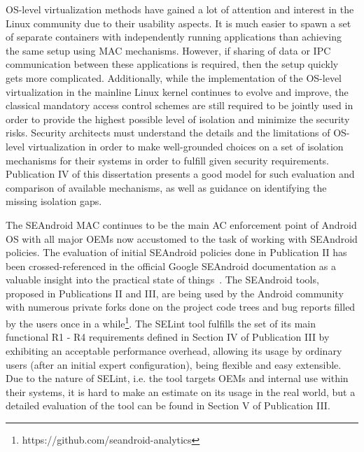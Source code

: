 OS-level virtualization methods have gained a lot of attention and interest in the Linux community due to their usability aspects. It is much easier to spawn a set of separate containers with independently running applications than achieving the same setup using MAC mechanisms. However, if sharing of data or IPC communication between these applications is required, then the setup quickly gets more complicated. Additionally, while the implementation of the OS-level virtualization in the mainline Linux kernel continues to evolve and improve, the classical mandatory access control schemes are still required to be jointly used in order to provide the highest possible level of isolation and minimize the security risks. Security architects must understand the details and the limitations of OS-level virtualization in order to make well-grounded choices on a set of isolation mechanisms for their systems in order to fulfill given security requirements. Publication IV of this dissertation presents a good model for such evaluation and comparison of available mechanisms, as well as guidance on identifying the missing isolation gaps. 

The SEAndroid MAC continues to be the main AC enforcement point of Android OS with all major OEMs now accustomed to the task of working with SEAndroid policies. The evaluation of initial SEAndroid policies done in Publication II has been crossed-referenced in the official Google SEAndroid documentation as a valuable insight into the practical state of things~\cite{seanroidsize}. The SEAndroid tools, proposed in Publications II and III, are being used by the Android community with numerous private forks done on the project code trees and bug reports filled by the users once in a while\footnote{https://github.com/seandroid-analytics}. The SELint tool fulfills the set of its main functional R1 - R4 requirements defined in Section IV of Publication III by exhibiting an acceptable performance overhead, allowing its usage by ordinary users (after an initial expert configuration), being flexible and easy extensible. Due to the nature of SELint, i.e. the tool targets OEMs and internal use within their systems, it is hard to make an estimate on its usage in the real world, but a detailed evaluation of the tool can be found in Section V of Publication III. 

